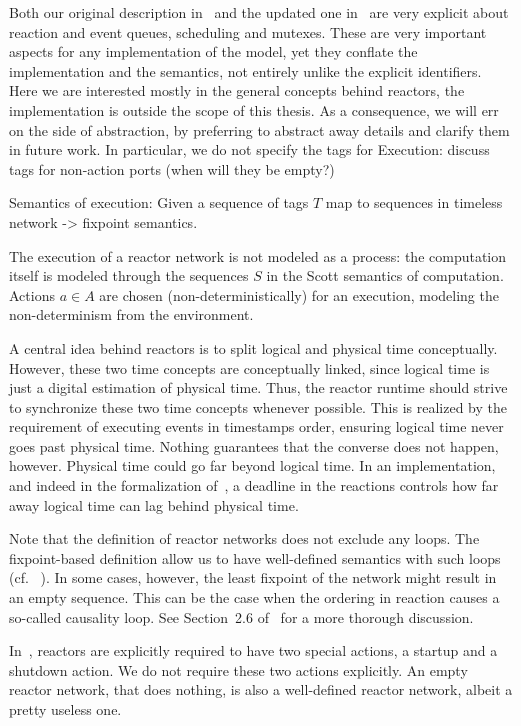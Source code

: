 \begin{defn}
\begin{defn}
\begin{defn}
\begin{defn}
Both our original description in~\cite{lohstroph_cyphy19} and the updated one in~\cite{lohstroh_phdthesis} are very explicit about reaction and event queues, scheduling and mutexes.
These are very important aspects for any implementation of the model, yet they conflate the implementation and the semantics, not entirely unlike the explicit identifiers.
Here we are interested mostly in the general concepts behind reactors, the implementation is outside the scope of this thesis.
As a consequence, we will err on the side of abstraction, by preferring to abstract away details and clarify them in future work. 
In particular, we do not specify the tags for 
Execution: discuss tags for non-action ports (when will they be empty?)

Semantics of execution:
Given a sequence of tags $T$ map to sequences in timeless network -> fixpoint semantics.

The execution of a reactor network is not modeled as a process: the computation itself is modeled through the sequences $S$ in the Scott semantics of computation.
Actions $a \in A$ are chosen (non-deterministically) for an execution, modeling the non-determinism from the environment.

A central idea behind reactors is to split logical and physical time conceptually.
However, these two time concepts are conceptually linked, since logical time is just a digital estimation of physical time.
Thus, the reactor runtime should strive to synchronize these two time concepts whenever possible.
This is realized by the requirement of executing events in timestamps order, ensuring logical time never goes past physical time.
Nothing guarantees that the converse does not happen, however.
Physical time could go far beyond logical time.
In an implementation, and indeed in the formalization of~\cite{lohstroh_phdthesis}, a deadline in the reactions controls how far away logical time can lag behind physical time. 

Note that the definition of reactor networks does not exclude any loops.
The fixpoint-based definition allow us to have well-defined semantics with such loops (cf. ~\cite{kahn_74,lee_matsikoudis_semantics}).
In some cases, however, the least fixpoint of the network might result in an empty sequence.
This can be the case when the ordering in reaction causes a so-called causality loop.
See Section~2.6 of~\cite{lohstroh_phdthesis} for a more thorough discussion.

In~\cite{lohstroh_phdthesis}, reactors are explicitly required to have two special actions, a startup and a shutdown action.
We do not require these two actions explicitly.
An empty reactor network, that does nothing, is also a well-defined reactor network, albeit a pretty useless one.


\end{defn}
\end{defn}
\end{defn}
\end{defn}
